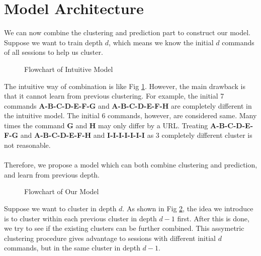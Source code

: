 \section{Model Architecture}
We can now combine the clustering and prediction part to construct our model.
Suppose we want to train depth \(d\), 
which means we know the initial \(d\) commands of all sessions to help us cluster.
\begin{figure}[h]
    \centering
    \scalebox{.8}{}
    \caption{Flowchart of Intuitive Model}
    \label{fig:model1}
\end{figure} 
The intuitive way of combination is like Fig \ref{fig:model1}. 
However, the main drawback is that it cannot learn from previous clustering.
For example, the initial 7 commands \textbf{A-B-C-D-E-F-G} and \textbf{A-B-C-D-E-F-H}
are completely different in the intuitive model. 
The initial 6 commands, however, are considered same.
Many times the command \textbf{G} and \textbf{H} may only differ by a URL.
Treating \textbf{A-B-C-D-E-F-G} and \textbf{A-B-C-D-E-F-H} and \textbf{I-I-I-I-I-I-I} 
as 3 completely different cluster is not reasonable.
\\\\
Therefore, we propose a model which can both combine clustering and prediction, and learn from previous depth.
\begin{figure}[h]
    \centering
    \scalebox{.8}{}
    \caption{Flowchart of Our Model}
    \label{fig:model2}
\end{figure}
Suppose we want to cluster in depth \(d\).
As shown in Fig \ref{fig:model2}, the idea we introduce is to cluster within each previous cluster in depth \(d-1\) first.
After this is done, we try to see if the existing clusters can be further combined.
This assymetric clustering procedure gives advantage to sessions with different initial \(d\) commands,
but in the same cluster in depth \(d-1\).    
